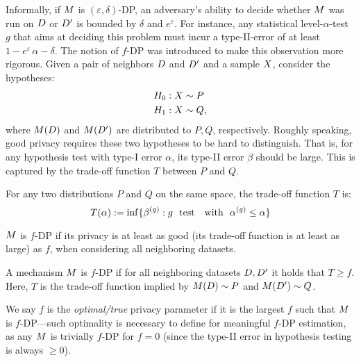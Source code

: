 Informally, if $M$ is $(\varepsilon, \delta)$-DP, an adversary's ability to decide whether $M$ was run on $D$ or $D'$ is bounded by $\delta$ and $e^{\varepsilon}$. 
For instance, any statistical level-$\alpha$-test $g$ that aims at deciding this problem must incur a type-II-error of at least $1 - e^{\varepsilon} \, \alpha - \delta$. The notion of $f$-DP was introduced to make this observation more rigorous.
Given a pair of neighbors $D$ and $D'$ and a sample $X$, consider the hypotheses:
\begin{align*}
    &H_0: X \sim P\\   
    &H_1: X \sim Q,
\end{align*}
where $M(D)$ and $M(D')$ are distributed to $P, Q$, respectively.  
Roughly speaking, good privacy requires these two hypotheses to be hard to distinguish. That is, for any hypothesis test with type-I error $\alpha$, its type-II error $\beta$ should be large. This is captured by the trade-off function $T$ between $P$ and $Q$. 
\begin{definition}
    For any two 
distributions $P$ and $Q$ on the same space, the 
trade-off function $T$ is: $$T(\alpha) := \inf \{\beta^{(g)}: g \,\,\textnormal{ test }\,\, \textnormal{ with } \,\, \alpha^{(g)}\le \alpha\}$$
\end{definition}

$M$ is $f$-DP if its privacy is at least as good (its trade-off function is at least as large) as $f$, when considering all neighboring datasets.
\begin{definition}
    A mechanism $M$ is $f$-DP if for all neighboring datasets $D, D'$ it holds that
    $T \geq f$. Here, $T$ is the trade-off function implied by $M(D) \sim P$ and $M(D') \sim Q$. 
\end{definition}


We say $f$ is the {\em optimal/true} privacy parameter if it is the largest $f$ such that $M$ is $f$-DP---such optimality is necessary to define for meaningful $f$-DP estimation, as any $M$ is trivially $f$-DP for $f = 0$ (since the type-II error in hypothesis testing is always $\geq 0$).

